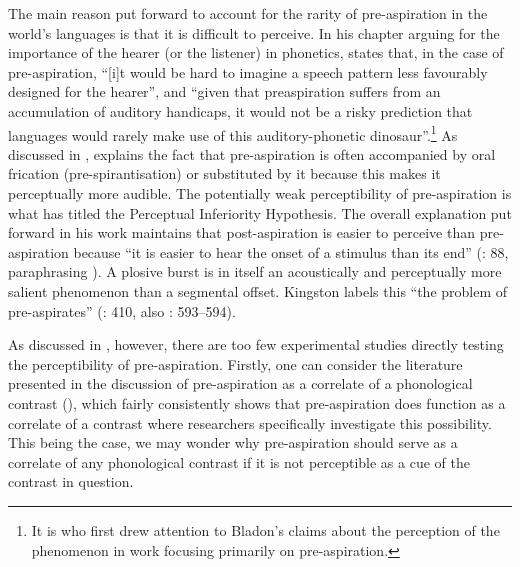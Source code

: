 \documentclass[output=paper]{langscibook}
\begin{document}
The main reason put forward to account for the rarity of pre\hyp aspiration in the world’s languages is that it is difficult to perceive. In his chapter arguing for the importance of the hearer (or the listener) in phonetics, \citet[7]{Bladon1986} states that, in the case of pre-aspiration, “[i]t would be hard to imagine a speech pattern less favourably designed for the hearer”, and “given that preaspiration suffers from an accumulation of auditory handicaps, it would not be a risky prediction that languages would rarely make use of this auditory-phonetic dinosaur”.\footnote{It is \citet[19]{Clayton2010} who first drew attention to Bladon’s claims about the perception of the phenomenon in work focusing primarily on pre-aspiration.} As discussed in , \citet{Silverman2003} explains the fact that pre\hyp aspiration is often accompanied by oral frication (pre-spirantisation) or substituted by it because this makes it perceptually more audible. The potentially weak perceptibility of pre\hyp aspiration is what \citet[87]{Clayton2010} has titled the Perceptual Inferiority Hypothesis. The overall explanation put forward in his work maintains that post-aspiration is easier to perceive than pre\hyp aspiration because “it is easier to hear the onset of a stimulus than its end” (\citealt{Clayton2010}: 88, paraphrasing \citealt{Bladon1986}). A plosive burst is in itself an acoustically and perceptually more salient phenomenon than a segmental offset. Kingston labels this “the problem of pre-aspirates” (\citealt{Kingston1990}: 410, also \citealt{Silverman2003}: 593--594).

As discussed in , however, there are too few experimental studies directly testing the perceptibility of pre-aspiration. Firstly, one can consider the literature presented in the discussion of pre\hyp aspiration as a correlate of a phonological contrast (), which fairly consistently shows that pre\hyp aspiration does function as a correlate of a contrast where researchers specifically investigate this possibility. This being the case, we may wonder why pre\hyp aspiration should serve as a correlate of any phonological contrast if it is not perceptible as a cue of the contrast in question.
\end{document}
